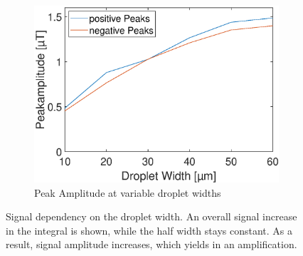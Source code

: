 \begin{figure}[h!]
	\vfil
	\begin{subfigure}[r]{0.49\linewidth} 
		\centering
		\includegraphics[clip,trim={0mm 0mm 0mm 0mm}, width=\linewidth]{Ressourcen/Results/W/Ampl}
		\caption{Peak Amplitude at variable droplet widths}
		\label{fig:sim:w:ampl}
	\end{subfigure}
	\hfil
	\caption{Signal dependency on the droplet width. An overall signal increase in the integral is shown, while the half width stays constant. As a result, signal amplitude increases, which yields in an amplification.}
	\label{fig:sim:w}
\end{figure}
\newpage
